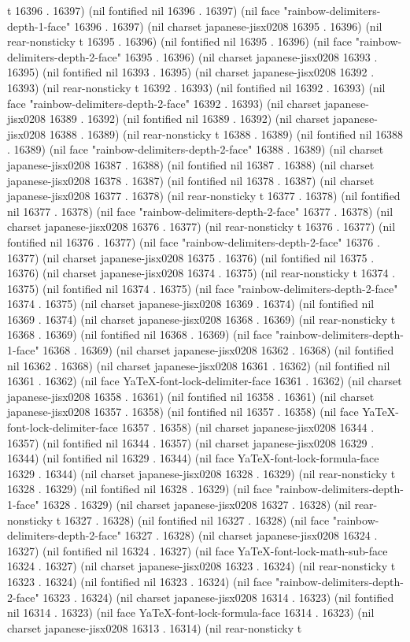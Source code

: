 t 16396 . 16397) (nil fontified nil 16396 . 16397) (nil face "rainbow-delimiters-depth-1-face" 16396 . 16397) (nil charset japanese-jisx0208 16395 . 16396) (nil rear-nonsticky t 16395 . 16396) (nil fontified nil 16395 . 16396) (nil face "rainbow-delimiters-depth-2-face" 16395 . 16396) (nil charset japanese-jisx0208 16393 . 16395) (nil fontified nil 16393 . 16395) (nil charset japanese-jisx0208 16392 . 16393) (nil rear-nonsticky t 16392 . 16393) (nil fontified nil 16392 . 16393) (nil face "rainbow-delimiters-depth-2-face" 16392 . 16393) (nil charset japanese-jisx0208 16389 . 16392) (nil fontified nil 16389 . 16392) (nil charset japanese-jisx0208 16388 . 16389) (nil rear-nonsticky t 16388 . 16389) (nil fontified nil 16388 . 16389) (nil face "rainbow-delimiters-depth-2-face" 16388 . 16389) (nil charset japanese-jisx0208 16387 . 16388) (nil fontified nil 16387 . 16388) (nil charset japanese-jisx0208 16378 . 16387) (nil fontified nil 16378 . 16387) (nil charset japanese-jisx0208 16377 . 16378) (nil rear-nonsticky t 16377 . 16378) (nil fontified nil 16377 . 16378) (nil face "rainbow-delimiters-depth-2-face" 16377 . 16378) (nil charset japanese-jisx0208 16376 . 16377) (nil rear-nonsticky t 16376 . 16377) (nil fontified nil 16376 . 16377) (nil face "rainbow-delimiters-depth-2-face" 16376 . 16377) (nil charset japanese-jisx0208 16375 . 16376) (nil fontified nil 16375 . 16376) (nil charset japanese-jisx0208 16374 . 16375) (nil rear-nonsticky t 16374 . 16375) (nil fontified nil 16374 . 16375) (nil face "rainbow-delimiters-depth-2-face" 16374 . 16375) (nil charset japanese-jisx0208 16369 . 16374) (nil fontified nil 16369 . 16374) (nil charset japanese-jisx0208 16368 . 16369) (nil rear-nonsticky t 16368 . 16369) (nil fontified nil 16368 . 16369) (nil face "rainbow-delimiters-depth-1-face" 16368 . 16369) (nil charset japanese-jisx0208 16362 . 16368) (nil fontified nil 16362 . 16368) (nil charset japanese-jisx0208 16361 . 16362) (nil fontified nil 16361 . 16362) (nil face YaTeX-font-lock-delimiter-face 16361 . 16362) (nil charset japanese-jisx0208 16358 . 16361) (nil fontified nil 16358 . 16361) (nil charset japanese-jisx0208 16357 . 16358) (nil fontified nil 16357 . 16358) (nil face YaTeX-font-lock-delimiter-face 16357 . 16358) (nil charset japanese-jisx0208 16344 . 16357) (nil fontified nil 16344 . 16357) (nil charset japanese-jisx0208 16329 . 16344) (nil fontified nil 16329 . 16344) (nil face YaTeX-font-lock-formula-face 16329 . 16344) (nil charset japanese-jisx0208 16328 . 16329) (nil rear-nonsticky t 16328 . 16329) (nil fontified nil 16328 . 16329) (nil face "rainbow-delimiters-depth-1-face" 16328 . 16329) (nil charset japanese-jisx0208 16327 . 16328) (nil rear-nonsticky t 16327 . 16328) (nil fontified nil 16327 . 16328) (nil face "rainbow-delimiters-depth-2-face" 16327 . 16328) (nil charset japanese-jisx0208 16324 . 16327) (nil fontified nil 16324 . 16327) (nil face YaTeX-font-lock-math-sub-face 16324 . 16327) (nil charset japanese-jisx0208 16323 . 16324) (nil rear-nonsticky t 16323 . 16324) (nil fontified nil 16323 . 16324) (nil face "rainbow-delimiters-depth-2-face" 16323 . 16324) (nil charset japanese-jisx0208 16314 . 16323) (nil fontified nil 16314 . 16323) (nil face YaTeX-font-lock-formula-face 16314 . 16323) (nil charset japanese-jisx0208 16313 . 16314) (nil rear-nonsticky t 